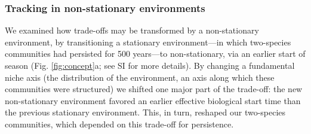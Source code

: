 \documentclass[11pt,letterpaper]{article}
\begin{document}
\subsubsection{Tracking in non-stationary environments}
We examined how trade-offs may be transformed by a non-stationary environment, by transitioning a stationary environment---in which two-species communities had persisted for 500 years---to non-stationary, via an earlier start of season (Fig. \ref {fig:concept}a; see SI for more details). By changing a fundamental niche axis (the distribution of the environment, an axis along which these communities were structured) we shifted one major part of the trade-off: the new non-stationary environment favored an earlier effective biological start time than the previous stationary environment. This, in turn, reshaped our two-species communities, which depended on this trade-off for persistence. %
\end{document}
